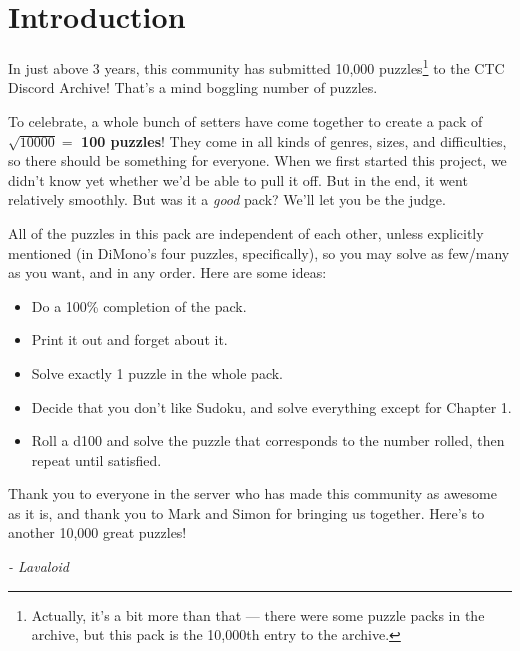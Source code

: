 \chapter{Introduction}

In just above 3 years, this community has submitted 10,000 puzzles\footnote{Actually, it's a bit 
more than that --- there were some puzzle packs in the archive, but this pack is the 10,000th entry 
to the archive.} to the CTC Discord Archive! That's a mind boggling number of puzzles. 

To celebrate, a whole bunch of setters have come together to create a pack of $\sqrt{10000} =$ \textbf{100 puzzles}! 
They come in all kinds of genres, sizes, and difficulties, so there should be something for everyone.
When we first started this project, we didn't know yet whether we'd be able to pull it off. But in
the end, it went relatively smoothly. But was it a \emph{good} pack? We'll let you be the judge.


All of the puzzles in this pack are independent of each other, unless explicitly mentioned (in DiMono's
four puzzles, specifically), so you may solve as few/many as you want, and in any order. Here are some ideas:
\begin{itemize}
  \item Do a 100\% completion of the pack.
  \item Print it out and forget about it.
  \item Solve exactly 1 puzzle in the whole pack.
  \item Decide that you don't like Sudoku, and solve everything except for Chapter 1.
  \item Roll a d100 and solve the puzzle that corresponds to the number rolled, then repeat until satisfied.
\end{itemize}

Thank you to everyone in the server who has made this community as awesome as it is, and thank you to Mark 
and Simon for bringing us together. Here's to another 10,000 great puzzles!

\vspace{2em}

\hfill \emph{- Lavaloid}

